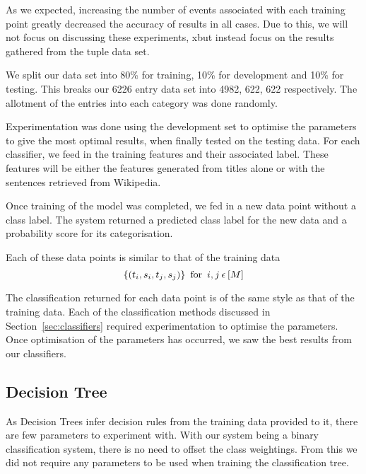 \documentclass[bsc,frontabs,twoside,singlespacing,parskip,deptreport]{infthesis}     %
\begin{document}
As we expected, increasing the number of events associated with each training point greatly decreased the accuracy of results in all cases.
Due to this, we will not focus on discussing these experiments, xbut instead focus on the results gathered from the tuple data set.

We split our data set into 80\% for training, 10\% for development and 10\% for testing.
This breaks our 6226 entry data set into 4982, 622, 622 respectively.
The allotment of the entries into each category was done randomly.

Experimentation was done using the development set to optimise the parameters to give the most optimal results,
when finally tested on the testing data.
For each classifier, we feed in the training features and their associated label. These features will
be either the features generated from titles alone or with the sentences retrieved from Wikipedia.

Once training of the model was completed, we fed in a new data point without a class label.
The system returned a predicted class label for the new data and a probability score for its categorisation.

Each of these data points is similar to that of the training data
 \begin{equation}
   \{(t_{i},s_{i},t_{j},s_{j})\} \hspace{0.5em} \text{for} \hspace{0.5em} i,j \hspace{0.2em}\epsilon \hspace{0.2em}[M]\nonumber
 \end{equation}

 The classification returned for each data point is of the same style as that of the training data.
 Each of the classification methods discussed in Section~\ref{sec:classifiers} required experimentation to optimise the
 parameters. Once optimisation of the parameters has occurred, we saw the best results from our classifiers.

 \subsection{Decision Tree}
 As Decision Trees infer decision rules from the training data provided to it, there are few parameters to
 experiment with. With our system being a binary classification system, there is no need to offset the class weightings.
 From this we did not require any parameters to be used when training the classification tree.
 
\end{document}
